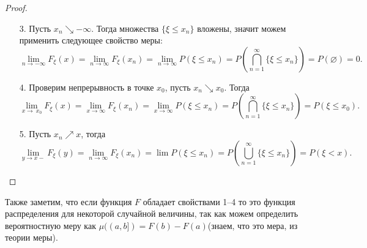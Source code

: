 \begin{proof}
\enewline
   \begin{enumerate}
   \item[3.] Пусть $x_n\searrow -\infty$. Тогда множества $\{\xi \le x_n\}$ вложены, значит можем применить следующее свойство меры:
   $$\lim_{n\rightarrow -\infty} F_\xi (x) = \lim_{n \to \infty} F_{\xi}(x_n) = \underset{n\rightarrow \infty}{\lim} P(\xi\le x_n) = P \left(\overset{\infty}{\underset{n = 1}{\bigcap}} \{\xi\le x_n\}\right) = P(\varnothing) = 0.$$
   \item[4.]Проверим непрерывность в точке $x_0$, пусть $x_n\searrow x_0$.
                  Тогда 
                  $$\lim_{x \to \ x_0} F_\xi(x) = \underset{x\rightarrow\infty}{\lim} F_\xi (x_n)= \underset{x\rightarrow\infty}{\lim} P(\xi \le x_n) =
                      P\left(\overset{\infty}{\underset{n = 1}{\bigcap}} \{ \xi\le x_n\}\right) = P(\xi\le x_0).$$
   \item[5.] Пусть $x_n \nearrow x$, тогда
   $$\lim_{y\rightarrow x-} F_\xi(y)= \lim_{n \to \infty} F_\xi(x_n) = \lim P(\xi\le x_n) = P\left(\overset{\infty}{\underset{n = 1}{\bigcup}} \{\xi\le x_n\}\right) = P(\xi < x).$$ \qedhere
   \end{enumerate}
\end{proof}
   
   Также заметим, что если функция $F$ обладает свойствами 1--4 то это функция распределения для некоторой случайной величины, так как можем определить вероятностную меру как $\mu((a, b]) = F(b) - F(a)$(знаем, что это мера, из теории меры).

\newpage
